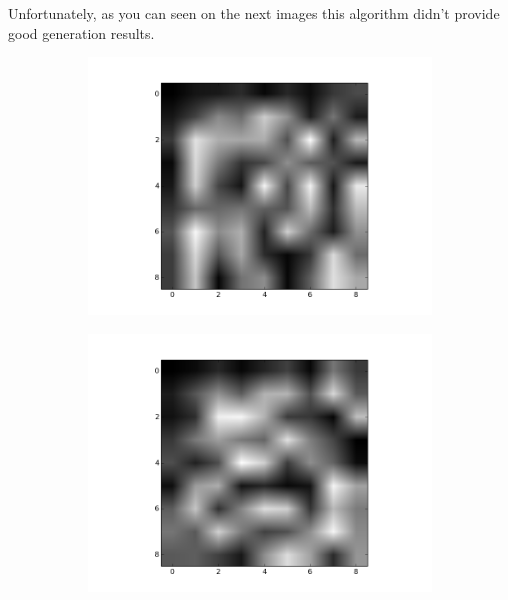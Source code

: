 \documentclass{article}
\begin{document}
 
Unfortunately, as you can seen on the next images this algorithm didn't provide good generation results.
\begin{figure}[ht]
        \centering
        \begin{subfigure}[b]{0.5\textwidth}
                \includegraphics[width=\textwidth]{../new3DTn_1.png}
        \end{subfigure}%
        \begin{subfigure}[b]{0.5\textwidth}
                \includegraphics[width=\textwidth]{../new3DTn_2.png}
        \end{subfigure}
        \begin{subfigure}[b]{0.5\textwidth}

\end{subfigure}
\end{figure}
\end{document}
